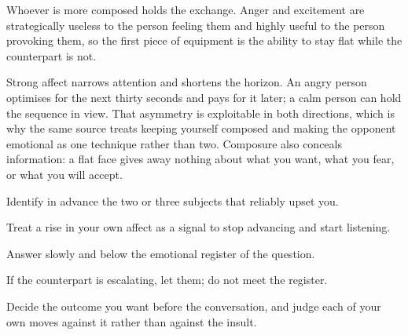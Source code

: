 


\begin{core}
Whoever is more composed holds the exchange. Anger and excitement are strategically useless to the person feeling them and highly useful to the person provoking them, so the first piece of equipment is the ability to stay flat while the counterpart is not.
\end{core}

\begin{mechanism}
Strong affect narrows attention and shortens the horizon. An angry person optimises for the next thirty seconds and pays for it later; a calm person can hold the sequence in view. That asymmetry is exploitable in both directions, which is why the same source treats keeping yourself composed and making the opponent emotional as one technique rather than two. Composure also conceals information: a flat face gives away nothing about what you want, what you fear, or what you will accept.
\end{mechanism}

\begin{application}
  \item Identify in advance the two or three subjects that reliably upset you.
  \item Treat a rise in your own affect as a signal to stop advancing and start listening.
  \item Answer slowly and below the emotional register of the question.
  \item If the counterpart is escalating, let them; do not meet the register.
  \item Decide the outcome you want before the conversation, and judge each of your own moves against it rather than against the insult.
\end{application}

